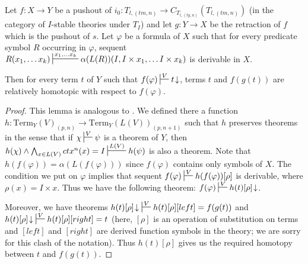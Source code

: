 \documentclass[reqno]{amsart}
\theoremstyle{definition}
\theoremstyle{remark}
\newcommand{\Term}{\mathrm{Term}}
\newcommand{\cyli}{i}
\numberwithin{figure}{section}
\begin{document}
\begin{lem}
Let $f : X \to Y$ be a pushout of $\cyli_0 : T_{l,(tm,n)} \to C_{T_{l,(ty,n)}}(T_{l,(tm,n)})$ (in the category of $I$-stable theories under $T_I$)
and let $g : Y \to X$ be the retraction of $f$ which is the pushout of $s$.
Let $\varphi$ be a formula of $X$ such that for every predicate symbol $R$ occurring in $\varphi$,
sequent $R(x_1, \ldots x_k) \sststile{}{x_1, \ldots x_k} \alpha(L(R))(I, I \times x_1, \ldots I \times x_k)$ is derivable in $X$.

Then for every term $t$ of $Y$ such that $f(\varphi) \sststile{}{V} t\!\downarrow$, terms $t$ and $f(g(t))$ are relatively homotopic with respect to $f(\varphi)$.
\end{lem}
\begin{proof}
This lemma is analogous to \cite[Lemma~3.7]{alg-models}.
We defined there a function $h : \Term_Y(V)_{(p,n)} \to \Term_Y(L(V))_{(p,n+1)}$ such that $h$ preserves theorems in the sense that
if $\chi \sststile{}{V} \psi$ is a theorem of $Y$, then $h(\chi) \land \bigwedge_{x \in L(V)} ctx^n(x) = I \sststile{}{L(V)} h(\psi)$ is also a theorem.
Note that $h(f(\varphi)) = \alpha(L(f(\varphi)))$ since $f(\varphi)$ contains only symbols of $X$.
The condition we put on $\varphi$ implies that sequent $f(\varphi) \sststile{}{V} h(f(\varphi))[\rho]$ is derivable, where $\rho(x) = I \times x$.
Thus we have the following theorem: $f(\varphi) \sststile{}{V} h(t)[\rho]\!\downarrow$.

Moreover, we have theorems $h(t)[\rho]\!\downarrow\ \sststile{}{V} h(t)[\rho][left] = f(g(t))$ and $h(t)[\rho]\!\downarrow\ \sststile{}{V} h(t)[\rho][right] = t$
(here, $[\rho]$ is an operation of substitution on terms and $[left]$ and $[right]$ are derived function symbols in the theory; we are sorry for this clash of the notation).
Thus $h(t)[\rho]$ gives us the required homotopy between $t$ and $f(g(t))$.
\end{proof}
\end{document}
